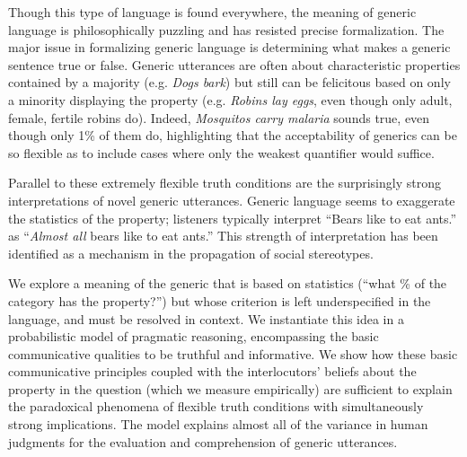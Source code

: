 \documentclass[11pt,letterpaper]{letter} %
\begin{document}
\begin{letter}
Though this type of language is found everywhere, the meaning of generic language is philosophically puzzling and has resisted precise formalization. 
The major issue in formalizing generic language is determining what makes a generic sentence true or false.
Generic utterances are often about characteristic properties contained by a majority (e.g. \emph{Dogs bark}) but still can be felicitous based on only a minority displaying the property (e.g. \emph{Robins lay eggs}, even though only adult, female, fertile robins do). 
Indeed, \emph{Mosquitos carry malaria} sounds true, even though only 1\% of them do, highlighting that the acceptability of generics can be so flexible as to include cases where only the weakest quantifier would suffice. 

Parallel to these extremely flexible truth conditions are the surprisingly strong interpretations of novel generic utterances.
Generic language seems to exaggerate the statistics of the property; listeners typically interpret ``Bears like to eat ants.'' as ``\emph{Almost all} bears like to eat ants.''
This strength of interpretation has been identified as a mechanism in the propagation of social stereotypes. 


% 

We explore a meaning of the generic that is based on statistics (``what \% of the category has the property?'') but 
whose criterion is left underspecified in the language, and must be resolved in context.
We instantiate this idea in a probabilistic model of pragmatic reasoning, encompassing the basic communicative qualities to be truthful and informative. 
We show how these basic communicative principles coupled with the interlocutors' beliefs about the property in the question (which we measure empirically) are sufficient to explain the paradoxical phenomena of flexible truth conditions with simultaneously strong implications.
The model explains almost all of the variance in human judgments for the evaluation and comprehension of generic utterances.


\end{letter}
\end{document}
